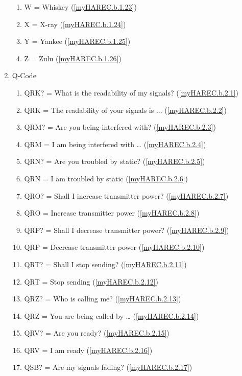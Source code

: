 \begin{enumerate}[noitemsep]
\begin{enumerate}[noitemsep]
\item W = Whiskey (\ref{myHAREC.b.1.23})\label{HAREC.b.1.23}
\item X = X-ray (\ref{myHAREC.b.1.24})\label{HAREC.b.1.24}
\item Y = Yankee (\ref{myHAREC.b.1.25})\label{HAREC.b.1.25}
\item Z = Zulu (\ref{myHAREC.b.1.26})\label{HAREC.b.1.26}
\end{enumerate}
\item Q-Code
\begin{enumerate}[noitemsep]
\item QRK? = What is the readability of my signals? (\ref{myHAREC.b.2.1})\label{HAREC.b.2.1}
\item QRK  = The readability of your signals is ... (\ref{myHAREC.b.2.2})\label{HAREC.b.2.2}
\item QRM? = Are you being interfered with? (\ref{myHAREC.b.2.3})\label{HAREC.b.2.3}
\item QRM  = I am being interfered with … (\ref{myHAREC.b.2.4})\label{HAREC.b.2.4}
\item QRN? = Are you troubled by static? (\ref{myHAREC.b.2.5})\label{HAREC.b.2.5}
\item QRN  = I am troubled by static (\ref{myHAREC.b.2.6})\label{HAREC.b.2.6}
\item QRO? = Shall I increase transmitter power? (\ref{myHAREC.b.2.7})\label{HAREC.b.2.7}
\item QRO  = Increase transmitter power (\ref{myHAREC.b.2.8})\label{HAREC.b.2.8}
\item QRP? = Shall I decrease transmitter power? (\ref{myHAREC.b.2.9})\label{HAREC.b.2.9}
\item QRP  = Decrease transmitter power (\ref{myHAREC.b.2.10})\label{HAREC.b.2.10}
\item QRT? = Shall I stop sending? (\ref{myHAREC.b.2.11})\label{HAREC.b.2.11}
\item QRT  = Stop sending (\ref{myHAREC.b.2.12})\label{HAREC.b.2.12}
\item QRZ? = Who is calling me? (\ref{myHAREC.b.2.13})\label{HAREC.b.2.13}
\item QRZ  = You are being called by … (\ref{myHAREC.b.2.14})\label{HAREC.b.2.14}
\item QRV? = Are you ready? (\ref{myHAREC.b.2.15})\label{HAREC.b.2.15}
\item QRV  = I am ready (\ref{myHAREC.b.2.16})\label{HAREC.b.2.16}
\item QSB? = Are my signals fading? (\ref{myHAREC.b.2.17})\label{HAREC.b.2.17}

\end{enumerate}
\end{enumerate}
